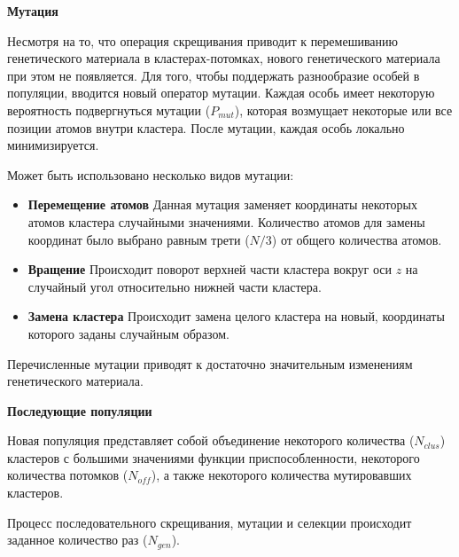 {\bf Мутация}

Несмотря на то, что операция скрещивания приводит к перемешиванию генетического материала
в кластерах-потомках, нового генетического материала при этом не появляется. Для того, чтобы
поддержать разнообразие особей в популяции, вводится новый оператор мутации. Каждая особь
имеет некоторую вероятность подвергнуться мутации ($P_{mut}$), которая возмущает некоторые или
все позиции атомов внутри кластера. После мутации, каждая особь локально минимизируется.

Может быть использовано несколько видов мутации:

\begin{itemize}
  \item{\bf Перемещение атомов} {Данная мутация заменяет координаты некоторых атомов кластера
случайными значениями. Количество атомов для замены координат было выбрано равным
трети ($N/3$) от общего количества атомов.}
\item{\bf Вращение} Происходит поворот верхней части кластера вокруг оси $z$ на случайный угол
относительно нижней части кластера.
\item{\bf Замена кластера} Происходит замена целого кластера на новый, координаты которого заданы
случайным образом. 
\end{itemize}

Перечисленные мутации приводят к достаточно значительным изменениям генетического материала.


{\bf Последующие популяции}

Новая популяция представляет собой объединение некоторого количества ($N_{clus}$) кластеров
с большими значениями функции приспособленности, некоторого количества потомков ($N_{off}$),
а также некоторого количества мутировавших кластеров.

Процесс последовательного скрещивания, мутации и селекции происходит заданное количество
раз ($N_{gen}$).
